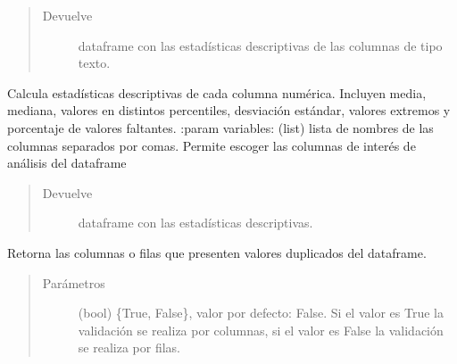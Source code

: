 \documentclass[letterpaper,10pt,openany,spanish]{sphinxmanual}
\begin{document}
\begin{fulllineitems}
\begin{fulllineitems}
\begin{quote}
\begin{description}
\begin{itemize}
\end{itemize}

\item[{Devuelve}] \leavevmode
dataframe con las estadísticas descriptivas de las columnas             de tipo texto.

\end{description}\end{quote}

\end{fulllineitems}


\begin{fulllineitems}
\label{\detokenize{calidad_datos:calidad_datos.CalidadDatos.DescripcionNumericas}}
Calcula estadísticas descriptivas de cada columna numérica.             Incluyen media, mediana, valores en distintos percentiles,            desviación estándar, valores extremos y porcentaje de valores             faltantes.
:param variables: (list) lista de nombres de las columnas separados             por comas. Permite escoger las columnas de interés de análisis             del dataframe
\begin{quote}\begin{description}
\item[{Devuelve}] \leavevmode
dataframe con las estadísticas descriptivas.

\end{description}\end{quote}

\end{fulllineitems}


\begin{fulllineitems}
\label{\detokenize{calidad_datos:calidad_datos.CalidadDatos.EmparejamientoDuplicados}}
Retorna las columnas o filas que presenten valores duplicados del             dataframe.
\begin{quote}\begin{description}
\item[{Parámetros}] \leavevmode
{} \textendash{} (bool) \{True, False\}, valor por defecto: False. Si el valor             es True la validación se realiza por columnas, si el valor es                 False la validación se realiza por filas.


\end{description}
\end{quote}
\end{fulllineitems}
\end{fulllineitems}
\end{document}
